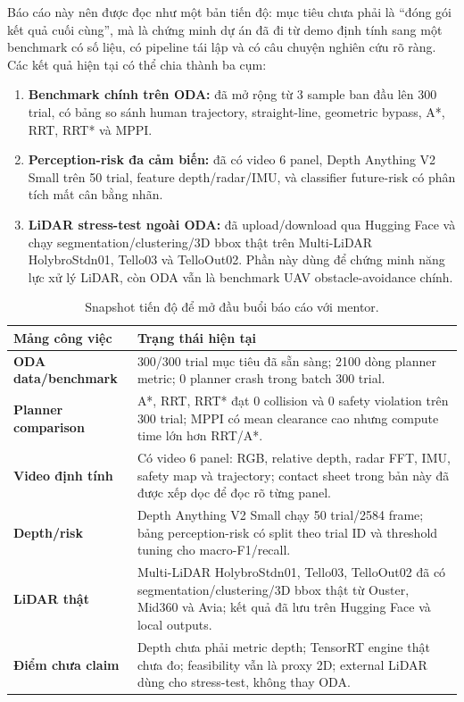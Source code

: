 \documentclass[10pt,a4paper]{article}
\begin{document}
Báo cáo này nên được đọc như một bản tiến độ: mục tiêu chưa phải là ``đóng gói kết quả cuối cùng'', mà là chứng minh dự án đã đi từ demo định tính sang một benchmark có số liệu, có pipeline tái lập và có câu chuyện nghiên cứu rõ ràng. Các kết quả hiện tại có thể chia thành ba cụm:

\begin{enumerate}
  \item \textbf{Benchmark chính trên ODA:} đã mở rộng từ 3 sample ban đầu lên 300 trial, có bảng so sánh human trajectory, straight-line, geometric bypass, A*, RRT, RRT* và MPPI.
  \item \textbf{Perception-risk đa cảm biến:} đã có video 6 panel, Depth Anything V2 Small trên 50 trial, feature depth/radar/IMU, và classifier future-risk có phân tích mất cân bằng nhãn.
  \item \textbf{LiDAR stress-test ngoài ODA:} đã upload/download qua Hugging Face và chạy segmentation/clustering/3D bbox thật trên Multi-LiDAR HolybroStdn01, Tello03 và TelloOut02. Phần này dùng để chứng minh năng lực xử lý LiDAR, còn ODA vẫn là benchmark UAV obstacle-avoidance chính.
\end{enumerate}

\begin{table}[H]
\centering
\small
\caption{Snapshot tiến độ để mở đầu buổi báo cáo với mentor.}
\begin{tabularx}{0.96\linewidth}{>{\bfseries}p{3.7cm} X}
\toprule
Mảng công việc & Trạng thái hiện tại \\
\midrule
ODA data/benchmark & 300/300 trial mục tiêu đã sẵn sàng; 2100 dòng planner metric; 0 planner crash trong batch 300 trial. \\
Planner comparison & A*, RRT, RRT* đạt 0 collision và 0 safety violation trên 300 trial; MPPI có mean clearance cao nhưng compute time lớn hơn RRT/A*. \\
Video định tính & Có video 6 panel: RGB, relative depth, radar FFT, IMU, safety map và trajectory; contact sheet trong bản này đã được xếp dọc để đọc rõ từng panel. \\
Depth/risk & Depth Anything V2 Small chạy 50 trial/2584 frame; bảng perception-risk có split theo trial ID và threshold tuning cho macro-F1/recall. \\
LiDAR thật & Multi-LiDAR HolybroStdn01, Tello03, TelloOut02 đã có segmentation/clustering/3D bbox thật từ Ouster, Mid360 và Avia; kết quả đã lưu trên Hugging Face và local outputs. \\
Điểm chưa claim & Depth chưa phải metric depth; TensorRT engine thật chưa đo; feasibility vẫn là proxy 2D; external LiDAR dùng cho stress-test, không thay ODA. \\
\bottomrule
\end{tabularx}
\end{table}
\end{document}
